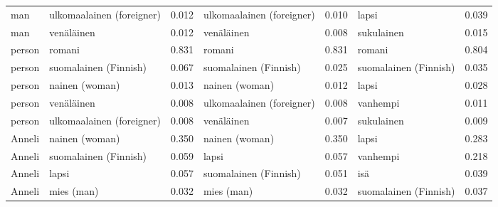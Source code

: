 \begin{longtable}{llrlrlr}
   man & ulkomaalainen (foreigner) &                            0.012 & ulkomaalainen (foreigner) &                                 0.010 &                 lapsi &                           0.039 \\
   man &                venäläinen &                            0.012 &                venäläinen &                                 0.008 &            sukulainen &                           0.015 \\
person &                    romani &                            0.831 &                    romani &                                 0.831 &                romani &                           0.804 \\
person &     suomalainen (Finnish) &                            0.067 &     suomalainen (Finnish) &                                 0.025 & suomalainen (Finnish) &                           0.035 \\
person &            nainen (woman) &                            0.013 &            nainen (woman) &                                 0.012 &                 lapsi &                           0.028 \\
person &                venäläinen &                            0.008 & ulkomaalainen (foreigner) &                                 0.008 &              vanhempi &                           0.011 \\
person & ulkomaalainen (foreigner) &                            0.008 &                venäläinen &                                 0.007 &            sukulainen &                           0.009 \\
Anneli &            nainen (woman) &                            0.350 &            nainen (woman) &                                 0.350 &                 lapsi &                           0.283 \\
Anneli &     suomalainen (Finnish) &                            0.059 &                     lapsi &                                 0.057 &              vanhempi &                           0.218 \\
Anneli &                     lapsi &                            0.057 &     suomalainen (Finnish) &                                 0.051 &                   isä &                           0.039 \\
Anneli &                mies (man) &                            0.032 &                mies (man) &                                 0.032 & suomalainen (Finnish) &                           0.037 \\

\end{longtable}
